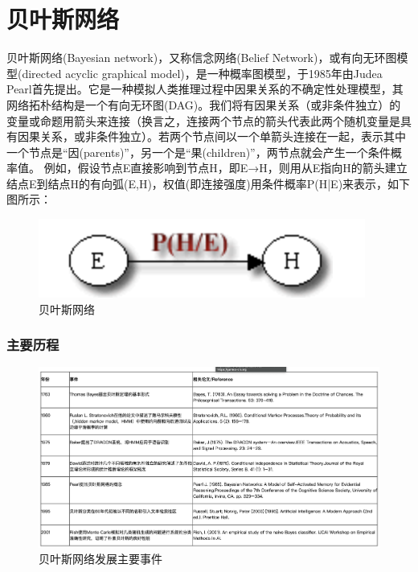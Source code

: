 \chapter{贝叶斯网络}

贝叶斯网络(Bayesian network)，又称信念网络(Belief Network)，或有向无环图模型(directed acyclic graphical model)，是一种概率图模型，于1985年由Judea Pearl首先提出。它是一种模拟人类推理过程中因果关系的不确定性处理模型，其网络拓朴结构是一个有向无环图(DAG)。我们将有因果关系（或非条件独立）的变量或命题用箭头来连接（换言之，连接两个节点的箭头代表此两个随机变量是具有因果关系，或非条件独立）。若两个节点间以一个单箭头连接在一起，表示其中一个节点是“因(parents)”，另一个是“果(children)”，两节点就会产生一个条件概率值。 例如，假设节点E直接影响到节点H，即E→H，则用从E指向H的箭头建立结点E到结点H的有向弧(E,H)，权值(即连接强度)用条件概率P(H|E)来表示，如下图所示：

\begin{figure}[H]
    \centering
    \includegraphics[scale=0.5]{figures/贝叶斯网络概述.png}
    \caption{贝叶斯网络}
\end{figure}

\subsection*{主要历程}

\begin{figure}[H]
    \centering
    \includegraphics[scale=0.16]{figures/贝叶斯网络发展主要事件.png}
    \caption{贝叶斯网络发展主要事件}
\end{figure}

